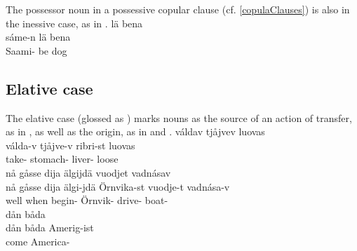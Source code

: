 The possessor noun in a possessive copular clause (cf. \ref{copulaClauses}) is also in the inessive case, as in .
\ea\label{iness3}
\glll	{} lä bena\\
	sáme-n lä bena\\
	Saami- be\BS{} dog\BS{}\\\nopagebreak
{} %
\z


\subsection{Elative case}\label{elative}
The elative case (glossed as \ELATs) marks nouns as the source of an action of transfer, as in , as well as the origin, as in  and . 
\ea\label{elat1}
\glll	váldav tjåjvev  luovas\\
	válda-v tjåjve-v ribri-st luovas\\
	take- stomach- liver- loose\\\nopagebreak
{} 
\z
\ea\label{elat2a}
\glll	nå gåsse dija älgijdä  vuodjet vadnásav\\
	nå gåsse dija älgi-jdä Örnvika-st vuodje-t vadnása-v\\ %
	well when  begin- Örnvik- drive- boat-\\\nopagebreak
{} 
\z
\ea\label{elat2b}
\glll	dån båda \\
	dån båda Amerig-ist\\
	 come\BS{} America-\\\nopagebreak
{} 
\z

